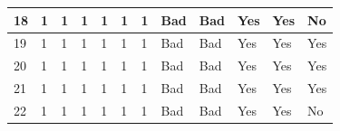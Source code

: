 \begin{table}[H]
\begin{tabular}{|l|l|l|l|l|l|l|l|l|l|l|l|}
18                                                          & 1  & 1    & 1   & 1     & 1    & 1                                                                     & Bad                                                     & Bad                                                      & Yes                                                                   & Yes                                                                   & No                                                                    \\ \hline
19                                                          & 1  & 1    & 1   & 1     & 1    & 1                                                                     & Bad                                                     & Bad                                                      & Yes                                                                   & Yes                                                                   & Yes                                                                   \\ \hline
20                                                          & 1  & 1    & 1   & 1     & 1    & 1                                                                     & Bad                                                     & Bad                                                      & Yes                                                                   & Yes                                                                   & Yes                                                                   \\ \hline
21                                                          & 1  & 1    & 1   & 1     & 1    & 1                                                                     & Bad                                                     & Bad                                                      & Yes                                                                   & Yes                                                                   & Yes                                                                   \\ \hline
22                                                          & 1  & 1    & 1   & 1     & 1    & 1                                                                     & Bad                                                     & Bad                                                      & Yes                                                                   & Yes                                                                   & No                                                                    \\ \hline

\end{tabular}
\end{table}
